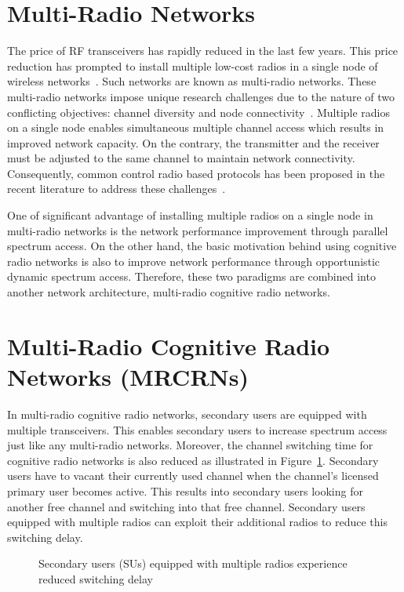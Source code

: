 \section{Multi-Radio Networks}

The price of RF transceivers has rapidly reduced in the last few years. This price reduction has prompted to install multiple low-cost radios in a single node of wireless networks~\cite{raniwala2005architecture}. Such networks are known as multi-radio networks. These multi-radio networks impose unique research challenges due to the nature of two conflicting objectives: channel diversity and node connectivity~\cite{wang2007survey}. Multiple radios on a single node enables simultaneous multiple channel access which results in improved network capacity. On the contrary, the transmitter and the receiver must be adjusted to the same channel to maintain network connectivity. Consequently, common control radio based protocols has been proposed in the recent literature to address these challenges~\cite{ko2007distributed, al2016channel, gabale2013classification, kyasanur2006routing, chatterjee2013low}.

One of significant advantage of installing multiple radios on a single node in multi-radio networks is the network performance improvement through parallel spectrum access. On the other hand, the basic motivation behind using cognitive radio networks is also to improve network performance through opportunistic dynamic spectrum access. Therefore, these two paradigms are combined into another network architecture, multi-radio cognitive radio networks. 

\section{Multi-Radio Cognitive Radio Networks (MRCRNs)}
In multi-radio cognitive radio networks, secondary users are equipped with multiple transceivers. This enables secondary users to increase spectrum access just like any multi-radio networks. Moreover, the channel switching time for cognitive radio networks is also reduced as illustrated in Figure~\ref{fig:switchingDelay}. Secondary users have to vacant their currently used channel when the channel's licensed primary user becomes active. This results into secondary users looking for another free channel and switching into that free channel. Secondary users equipped with multiple radios can exploit their additional radios to reduce this switching delay.

\begin{figure}[!htbp]
\begin{center}
    
    \caption{Secondary users (SUs) equipped with multiple radios experience reduced switching delay}
    \label{fig:switchingDelay}
\end{center}
\end{figure}

